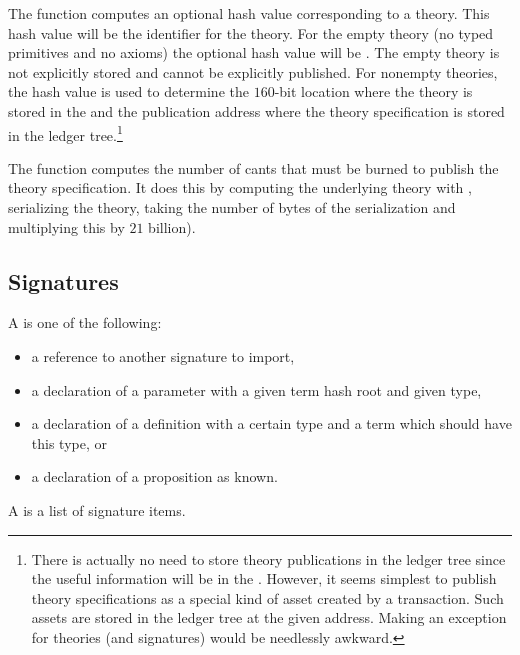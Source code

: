 The function {} computes an optional hash value corresponding to a theory.
This hash value will be the identifier for the theory.
For the empty theory (no typed primitives and no axioms) the optional hash value will be {}.
The empty theory is not explicitly stored and cannot be explicitly published.
For nonempty theories, the hash value is used to determine the $160$-bit location
where the theory is stored in the {}
and the publication address where the theory specification is stored in the ledger tree.\footnote{There is actually no need to store theory publications in the ledger tree since the useful information will be in the {}. However, it seems simplest to publish theory specifications as a special kind of asset created by a transaction. Such assets are stored in the ledger tree at the given address. Making an exception for theories (and signatures) would be needlessly awkward.}

The function {} computes the number of cants that must be burned
to publish the theory specification. It does this by computing the underlying theory with {},
serializing the theory, taking the number of bytes of the serialization and multiplying this by
$21$ billion).


\subsection{Signatures}

A {} is one of the following:
\begin{itemize}
\item a reference to another signature to import,
\item a declaration of a parameter with a given term hash root and given type,
\item a declaration of a definition with a certain type and a term which should have this type, or
\item a declaration of a proposition as known.
\end{itemize}
A {} is a list of signature items.

